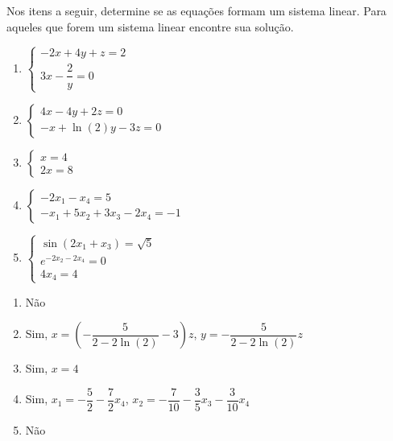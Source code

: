 \documentclass[12pt]{exam}
\begin{document}
\begin{exercicio}
  Nos itens a seguir, determine se as equações formam um sistema linear. Para aqueles que forem um sistema linear encontre sua solução.
  \begin{enumerate}[label={\alph*})]
    \item $\begin{cases} -2x + 4y + z = 2\\ 3x - \dfrac{2}{y} = 0\end{cases}$
    \item $\begin{cases} 4x - 4y + 2z = 0\\ -x + \ln(2)y - 3z = 0\end{cases}$
    \item $\begin{cases} x = 4\\ 2x = 8\end{cases}$
    \item $\begin{cases} -2x_1 - x_4 = 5\\ -x_1 + 5x_2 + 3x_3 - 2x_4 = -1\end{cases}$
    \item $\begin{cases} \sin(2x_1 + x_3) = \sqrt{5}\\ e^{-2x_2 - 2x_4} = 0\\ 4x_4 = 4\end{cases}$
  \end{enumerate}
  \begin{solucao}
    \begin{enumerate}[label={\alph*})]
      \item Não
    \item Sim, $x = \left(-\dfrac{5}{2 - 2\ln(2)} - 3\right)z$, $y = -\dfrac{5}{2 - 2\ln(2)}z$
      \item Sim, $x = 4$
      \item Sim, $x_1 = -\dfrac{5}{2} - \dfrac{7}{2}x_4$, $x_2 = -\dfrac{7}{10} - \dfrac{3}{5}x_3 - \dfrac{3}{10}x_4$
      \item Não
    \end{enumerate}
  \end{solucao}
\end{exercicio}
\end{document}
